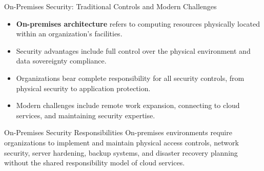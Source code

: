 \documentclass{beamer}
\begin{document}
            \begin{frame}{On-Premises Security: Traditional Controls and Modern Challenges}
            \begin{itemize}
            \item \textbf{On-premises architecture} refers to computing resources physically located within an organization's facilities.
            \item Security advantages include full control over the physical environment and data sovereignty compliance.
            \item Organizations bear complete responsibility for all security controls, from physical security to application protection.
            \item Modern challenges include remote work expansion, connecting to cloud services, and maintaining security expertise.
            \end{itemize}
            
            \begin{exampleblock}{On-Premises Security Responsibilities}
            On-premises environments require organizations to implement and maintain physical access controls, network security, server hardening, backup systems, and disaster recovery planning without the shared responsibility model of cloud services.
            \end{exampleblock}
            \end{frame}
            
\end{document}
